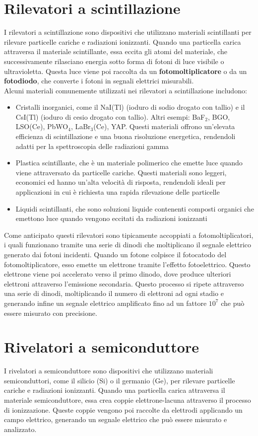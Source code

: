 \section{Rilevatori a scintillazione}
I rilevatori a scintillazione sono dispositivi che utilizzano materiali scintillanti per rilevare particelle cariche e radiazioni ionizzanti. Quando una particella carica attraversa il materiale scintillante, essa eccita gli atomi del materiale, che successivamente rilasciano energia sotto forma di fotoni di luce visibile o ultravioletta. Questa luce viene poi raccolta da un \textbf{fotomoltiplicatore} o da un \textbf{fotodiodo}, che converte i fotoni in segnali elettrici misurabili.\\
Alcuni materiali comunemente utilizzati nei rilevatori a scintillazione includono:
\begin{itemize}
    \item Cristalli inorganici, come il NaI(Tl) (ioduro di sodio drogato con tallio) e il CsI(Tl) (ioduro di cesio drogato con tallio). Altri esempi: BaF$_2$, BGO, LSO(Ce), PbWO$_4$, LaBr$_3$(Ce), YAP. Questi materiali offrono un'elevata efficienza di scintillazione e una buona risoluzione energetica, rendendoli adatti per la spettroscopia delle radiazioni gamma
    \item Plastica scintillante, che è un materiale polimerico che emette luce quando viene attraversato da particelle cariche. Questi materiali sono leggeri, economici ed hanno un'alta velocità di risposta, rendendoli ideali per applicazioni in cui è richiesta una rapida rilevazione delle particelle
    \item Liquidi scintillanti, che sono soluzioni liquide contenenti composti organici che emettono luce quando vengono eccitati da radiazioni ionizzanti
\end{itemize}
Come anticipato questi rilevatori sono tipicamente accoppiati a fotomoltiplicatori, i quali funzionano tramite una serie di dinodi che moltiplicano il segnale elettrico generato dai fotoni incidenti. Quando un fotone colpisce il fotocatodo del fotomoltiplicatore, esso emette un elettrone tramite l'effetto fotoelettrico. Questo elettrone viene poi accelerato verso il primo dinodo, dove produce ulteriori elettroni attraverso l'emissione secondaria. Questo processo si ripete attraverso una serie di dinodi, moltiplicando il numero di elettroni ad ogni stadio e generando infine un segnale elettrico amplificato fino ad un fattore $10^7$ che può essere misurato con precisione.

\section{Rivelatori a semiconduttore}
I rivelatori a semiconduttore sono dispositivi che utilizzano materiali semiconduttori, come il silicio (Si) o il germanio (Ge), per rilevare particelle cariche e radiazioni ionizzanti. Quando una particella carica attraversa il materiale semiconduttore, essa crea coppie elettrone-lacuna attraverso il processo di ionizzazione. Queste coppie vengono poi raccolte da elettrodi applicando un campo elettrico, generando un segnale elettrico che può essere misurato e analizzato.\\
